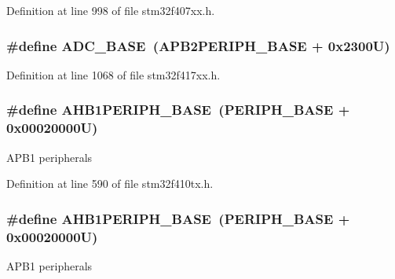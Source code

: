 Definition at line 998 of file stm32f407xx.\+h.

\subsubsection[{\texorpdfstring{A\+D\+C\+\_\+\+B\+A\+SE}{ADC_BASE}}]{\setlength{\rightskip}{0pt plus 5cm}\#define A\+D\+C\+\_\+\+B\+A\+SE~({\bf A\+P\+B2\+P\+E\+R\+I\+P\+H\+\_\+\+B\+A\+SE} + 0x2300\+U)}\hypertarget{group___peripheral__registers__structures_gad06cb9e5985bd216a376f26f22303cd6}{}\label{group___peripheral__registers__structures_gad06cb9e5985bd216a376f26f22303cd6}


Definition at line 1068 of file stm32f417xx.\+h.

\subsubsection[{\texorpdfstring{A\+H\+B1\+P\+E\+R\+I\+P\+H\+\_\+\+B\+A\+SE}{AHB1PERIPH_BASE}}]{\setlength{\rightskip}{0pt plus 5cm}\#define A\+H\+B1\+P\+E\+R\+I\+P\+H\+\_\+\+B\+A\+SE~({\bf P\+E\+R\+I\+P\+H\+\_\+\+B\+A\+SE} + 0x00020000\+U)}\hypertarget{group___peripheral__registers__structures_ga811a9a4ca17f0a50354a9169541d56c4}{}\label{group___peripheral__registers__structures_ga811a9a4ca17f0a50354a9169541d56c4}
A\+P\+B1 peripherals 

Definition at line 590 of file stm32f410tx.\+h.

\subsubsection[{\texorpdfstring{A\+H\+B1\+P\+E\+R\+I\+P\+H\+\_\+\+B\+A\+SE}{AHB1PERIPH_BASE}}]{\setlength{\rightskip}{0pt plus 5cm}\#define A\+H\+B1\+P\+E\+R\+I\+P\+H\+\_\+\+B\+A\+SE~({\bf P\+E\+R\+I\+P\+H\+\_\+\+B\+A\+SE} + 0x00020000\+U)}\hypertarget{group___peripheral__registers__structures_ga811a9a4ca17f0a50354a9169541d56c4}{}\label{group___peripheral__registers__structures_ga811a9a4ca17f0a50354a9169541d56c4}
A\+P\+B1 peripherals 

